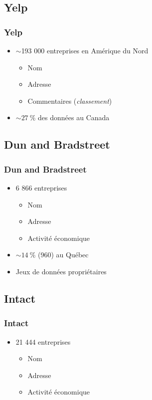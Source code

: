 \documentclass{beamer}
\begin{document}
	\subsection{Yelp}
	
	\begin{frame}[label=Yelp]\frametitle{Yelp} 
		\begin{itemize}
			\item<1-> $\sim$193 000 entreprises en Amérique du Nord
			\begin{itemize}
				\item Nom
				\item Adresse
				\item Commentaires (\textit{classement})
			\end{itemize}
			\item<2-> $\sim$$27~\%$ des données au Canada
		\end{itemize}
	\end{frame}
	
	\subsection{Dun and Bradstreet}
	
	\begin{frame}[label=DunnBrad]\frametitle{Dun and Bradstreet} 
		\begin{itemize}
			\item<1-> 6 866 entreprises
			\begin{itemize}
				\item Nom
				\item Adresse
				\item Activité économique
			\end{itemize}
			\item<2-> $\sim$$14~\%$ (960) au Québec
			\item<3-> Jeux de données propriétaires
		\end{itemize}
	\end{frame}
	
	\subsection{Intact}
	
	\begin{frame}[label=intact]\frametitle{Intact} 
		\begin{itemize}
			\item<1-> 21 444 entreprises
			\begin{itemize}
				\item Nom
				\item Adresse
				\item Activité économique
			\end{itemize}
		\end{itemize}
	\end{frame}
	
\end{document}
